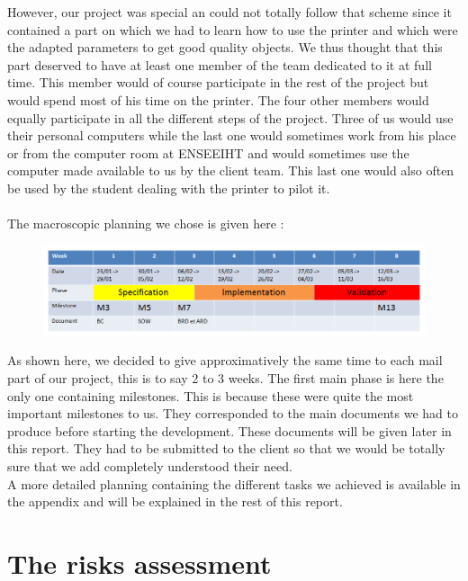 \documentclass{report}
\begin{document}
However, our project was special an could not totally follow that scheme since it contained a part on which we had to learn how to use the printer and which were the adapted parameters to get good quality objects. We thus thought that this part deserved to have at least one member of the team dedicated to it at full time. This member would of course participate in the rest of the project but would spend most of his time on the printer. The four other members would equally participate in all the different steps of the project. Three of us would use their personal computers while the last one would sometimes work from his place or from the computer room at ENSEEIHT and would sometimes use the computer made available to us by the client team. This last one would also often be used by the student dealing with the printer to pilot it.\\\\

The macroscopic planning we chose is given here :

\bigskip
\begin{figure}[!h]
\begin{center}
	\includegraphics[scale=0.4]{PlanningMacroscopique}
\end{center}
\end{figure}

As shown here, we decided to give approximatively the same time to each mail part of our project, this is to say 2 to 3 weeks. The first main phase is here the only one containing milestones. This is because these were quite the most important milestones to us. They corresponded to the main documents we had to produce before starting the development. These documents will be given later in this report. They had to be submitted to the client so that we would be totally sure that we add completely understood their need. \\

A more detailed planning containing the different tasks we achieved is available in the appendix and will be explained in the rest of this report.

\section{The risks assessment}
\end{document}
